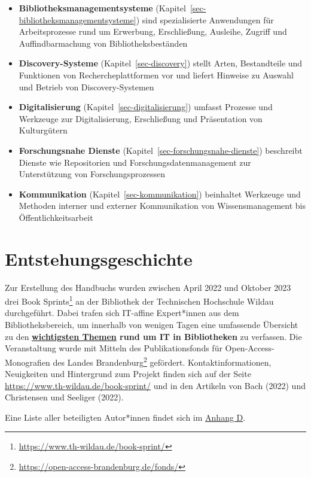 \documentclass[
  11pt,
  letterpaper,
  DIV=11,
  twoside]{scrreprt}
\DeclareRobustCommand{\href}[2]{#2\footnote{\url{#1}}}
\begin{document}
\begin{itemize}
\item
  \textbf{Bibliotheksmanagementsysteme}
  (Kapitel~\ref{sec-bibliotheksmanagementsysteme}) sind spezialisierte
  Anwendungen für Arbeitsprozesse rund um Erwerbung, Erschließung,
  Ausleihe, Zugriff und Auffindbarmachung von Bibliotheksbeständen
\item
  \textbf{Discovery-Systeme} (Kapitel~\ref{sec-discovery}) stellt Arten,
  Bestandteile und Funktionen von Rechercheplattformen vor und liefert
  Hinweise zu Auswahl und Betrieb von Discovery-Systemen
\item
  \textbf{Digitalisierung} (Kapitel~\ref{sec-digitalisierung}) umfasst
  Prozesse und Werkzeuge zur Digitalisierung, Erschließung und
  Präsentation von Kulturgütern
\item
  \textbf{Forschungsnahe Dienste}
  (Kapitel~\ref{sec-forschungsnahe-dienste}) beschreibt Dienste wie
  Repositorien und Forschungsdatenmanagement zur Unterstützung von
  Forschungsprozessen
\item
  \textbf{Kommunikation} (Kapitel~\ref{sec-kommunikation}) beinhaltet
  Werkzeuge und Methoden interner und externer Kommunikation von
  Wissensmanagement bis Öffentlichkeitsarbeit
\end{itemize}

\section{Entstehungsgeschichte}\label{entstehungsgeschichte}

Zur Erstellung des Handbuchs wurden zwischen April 2022 und Oktober 2023
\href{https://www.th-wildau.de/book-sprint/}{drei Book Sprints} an der
Bibliothek der Technischen Hochschule Wildau durchgeführt. Dabei trafen
sich IT-affine Expert*innen aus dem Bibliotheksbereich, um innerhalb von
wenigen Tagen eine umfassende Übersicht zu den
\textbf{\hyperref[inhalt]{wichtigsten Themen} rund um IT in
Bibliotheken} zu verfassen. Die Veranstaltung wurde mit Mitteln des
\href{https://open-access-brandenburg.de/fonds/}{Publikationsfonds für
Open-Access-Monografien des Landes Brandenburg} gefördert.
Kontaktinformationen, Neuigkeiten und Hintergrund zum Projekt finden
sich auf der Seite \url{https://www.th-wildau.de/book-sprint/} und in
den Artikeln von Bach (2022) und Christensen und Seeliger (2022).

Eine Liste aller beteiligten Autor*innen findet sich im
\hyperref[sec-contributors]{Anhang D}.
\end{document}
